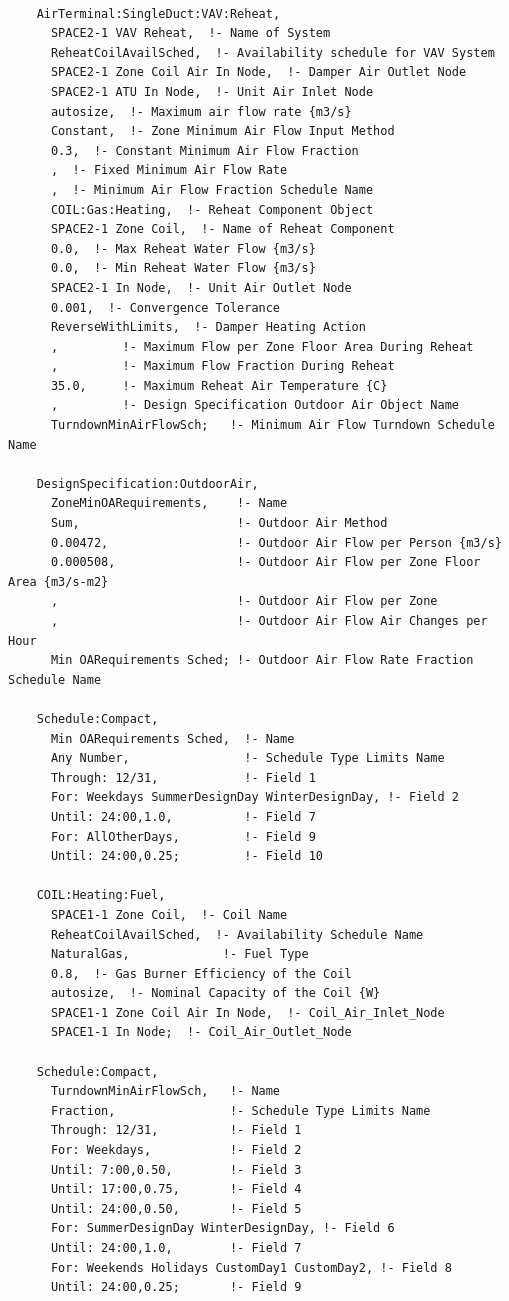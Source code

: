 \begin{lstlisting}

    AirTerminal:SingleDuct:VAV:Reheat,
      SPACE2-1 VAV Reheat,  !- Name of System
      ReheatCoilAvailSched,  !- Availability schedule for VAV System
      SPACE2-1 Zone Coil Air In Node,  !- Damper Air Outlet Node
      SPACE2-1 ATU In Node,  !- Unit Air Inlet Node
      autosize,  !- Maximum air flow rate {m3/s}
      Constant,  !- Zone Minimum Air Flow Input Method
      0.3,  !- Constant Minimum Air Flow Fraction
      ,  !- Fixed Minimum Air Flow Rate
      ,  !- Minimum Air Flow Fraction Schedule Name
      COIL:Gas:Heating,  !- Reheat Component Object
      SPACE2-1 Zone Coil,  !- Name of Reheat Component
      0.0,  !- Max Reheat Water Flow {m3/s}
      0.0,  !- Min Reheat Water Flow {m3/s}
      SPACE2-1 In Node,  !- Unit Air Outlet Node
      0.001,  !- Convergence Tolerance
      ReverseWithLimits,  !- Damper Heating Action
      ,         !- Maximum Flow per Zone Floor Area During Reheat
      ,         !- Maximum Flow Fraction During Reheat
      35.0,     !- Maximum Reheat Air Temperature {C}
      ,         !- Design Specification Outdoor Air Object Name
      TurndownMinAirFlowSch;   !- Minimum Air Flow Turndown Schedule Name

    DesignSpecification:OutdoorAir,
      ZoneMinOARequirements,    !- Name
      Sum,                      !- Outdoor Air Method
      0.00472,                  !- Outdoor Air Flow per Person {m3/s}
      0.000508,                 !- Outdoor Air Flow per Zone Floor Area {m3/s-m2}
      ,                         !- Outdoor Air Flow per Zone
      ,                         !- Outdoor Air Flow Air Changes per Hour
      Min OARequirements Sched; !- Outdoor Air Flow Rate Fraction Schedule Name

    Schedule:Compact,
      Min OARequirements Sched,  !- Name
      Any Number,                !- Schedule Type Limits Name
      Through: 12/31,            !- Field 1
      For: Weekdays SummerDesignDay WinterDesignDay, !- Field 2
      Until: 24:00,1.0,          !- Field 7
      For: AllOtherDays,         !- Field 9
      Until: 24:00,0.25;         !- Field 10

    COIL:Heating:Fuel,
      SPACE1-1 Zone Coil,  !- Coil Name
      ReheatCoilAvailSched,  !- Availability Schedule Name
      NaturalGas,             !- Fuel Type
      0.8,  !- Gas Burner Efficiency of the Coil
      autosize,  !- Nominal Capacity of the Coil {W}
      SPACE1-1 Zone Coil Air In Node,  !- Coil_Air_Inlet_Node
      SPACE1-1 In Node;  !- Coil_Air_Outlet_Node

    Schedule:Compact,
      TurndownMinAirFlowSch,   !- Name
      Fraction,                !- Schedule Type Limits Name
      Through: 12/31,          !- Field 1
      For: Weekdays,           !- Field 2
      Until: 7:00,0.50,        !- Field 3
      Until: 17:00,0.75,       !- Field 4
      Until: 24:00,0.50,       !- Field 5
      For: SummerDesignDay WinterDesignDay, !- Field 6
      Until: 24:00,1.0,        !- Field 7
      For: Weekends Holidays CustomDay1 CustomDay2, !- Field 8
      Until: 24:00,0.25;       !- Field 9
\end{lstlisting}

